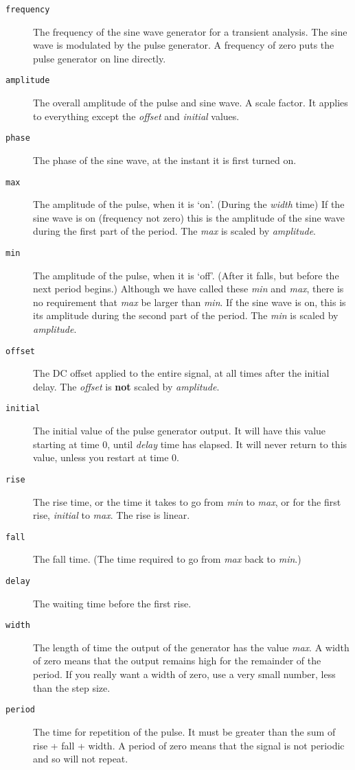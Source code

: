 \begin{description}

\item[{\tt frequency}]
The frequency of the sine wave generator for a transient analysis.
The sine wave is modulated by the pulse generator.  A frequency of
zero puts the pulse generator on line directly.

\item[{\tt amplitude}]
The overall amplitude of the pulse and sine wave.  A scale factor.  It
applies to everything except the {\it offset} and {\it initial}
values.

\item[{\tt phase}]
The phase of the sine wave, at the instant it is first turned on.

\item[{\tt max}]
The amplitude of the pulse, when it is `on'.  (During the {\it width}
time) If the sine wave is on (frequency not zero) this is the
amplitude of the sine wave during the first part of the period.  The
{\it max} is scaled by {\it amplitude}.

\item[{\tt min}]
The amplitude of the pulse, when it is `off'.  (After it falls, but
before the next period begins.)  Although we have called these {\it
min} and {\it max}, there is no requirement that {\it max} be larger
than {\it min}.  If the sine wave is on, this is its amplitude during
the second part of the period.  The {\it min} is scaled by {\it
amplitude}.

\item[{\tt offset}]
The DC offset applied to the entire signal, at all times after the
initial delay.  The {\it offset} is {\bf not} scaled by {\it
amplitude}.

\item[{\tt initial}]
The initial value of the pulse generator output.  It will have this
value starting at time 0, until {\it delay} time has elapsed.  It will
never return to this value, unless you restart at time 0.

\item[{\tt rise}]
The rise time, or the time it takes to go from {\it min} to {\it max},
or for the first rise, {\it initial} to {\it max}.  The rise is
linear.

\item[{\tt fall}]
The fall time.  (The time required to go from {\it max} back to {\it
min}.)

\item[{\tt delay}]
The waiting time before the first rise.

\item[{\tt width}]
The length of time the output of the generator has the value {\it
max}.  A width of zero means that the output remains high for the
remainder of the period.  If you really want a width of zero, use a
very small number, less than the step size.

\item[{\tt period}]
The time for repetition of the pulse.  It must be greater than the sum
of rise + fall + width.  A period of zero means that the signal is not
periodic and so will not repeat.

\end{description}
